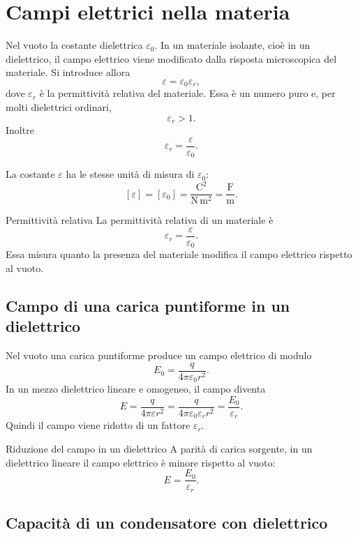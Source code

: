 \documentclass[a4paper]{article}
\begin{document}
\section{Campi elettrici nella materia}

Nel vuoto la costante dielettrica  \(\varepsilon_0\). In un materiale isolante, cioè in un dielettrico, il campo elettrico viene modificato dalla risposta microscopica del materiale. Si introduce allora
\[
    \varepsilon=\varepsilon_0\varepsilon_r,
\]
dove \(\varepsilon_r\) è la permittività relativa del materiale. Essa è un numero puro e, per molti dielettrici ordinari,
\[
    \varepsilon_r>1.
\]
Inoltre
\[
    \varepsilon_r=\frac{\varepsilon}{\varepsilon_0}.
\]

La costante \(\varepsilon\) ha le stesse unità di misura di \(\varepsilon_0\):
\[
    [\varepsilon]=[\varepsilon_0]=\frac{\mathrm{C}^2}{\mathrm{N}\,\mathrm{m}^2}=\frac{\mathrm{F}}{\mathrm{m}}.
\]

\begin{snippetdefinition}{Permittività relativa}
    La permittività relativa di un materiale è
    \[
        \varepsilon_r=\frac{\varepsilon}{\varepsilon_0}.
    \]
    Essa misura quanto la presenza del materiale modifica il campo elettrico rispetto al vuoto.
\end{snippetdefinition}

\subsection{Campo di una carica puntiforme in un dielettrico}

Nel vuoto una carica puntiforme produce un campo elettrico di modulo
\[
    E_0=\frac{q}{4\pi\varepsilon_0r^2}.
\]
In un mezzo dielettrico lineare e omogeneo, il campo diventa
\[
    E=\frac{q}{4\pi\varepsilon r^2}
    =\frac{q}{4\pi\varepsilon_0\varepsilon_r r^2}
    =\frac{E_0}{\varepsilon_r}.
\]
Quindi il campo viene ridotto di un fattore \(\varepsilon_r\).

\begin{snippetproposition}{Riduzione del campo in un dielettrico}
    A parità di carica sorgente, in un dielettrico lineare il campo elettrico è minore rispetto al vuoto:
    \[
        E=\frac{E_0}{\varepsilon_r}.
    \]
\end{snippetproposition}

\subsection{Capacità di un condensatore con dielettrico}
\end{document}
